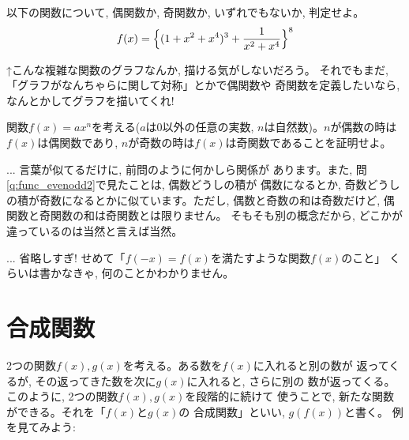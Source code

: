 \begin{q}\label{q:func_evenodd25} 以下の関数について, 偶関数か, 奇関数か, 
いずれでもないか, 判定せよ。
\begin{eqnarray}
f(x)=\Bigl\{(1+x^2+x^4)^3+\frac{1}{x^2+x^4}\Bigr\}^8
\end{eqnarray}\end{q}
↑こんな複雑な関数のグラフなんか, 描ける気がしないだろう。
それでもまだ, 「グラフがなんちゃらに関して対称」とかで偶関数や
奇関数を定義したいなら, なんとかしてグラフを描いてくれ!
\mv

\begin{q}\label{q:func_evenodd28} 関数$f(x)=ax^n$を考える($a$は0以外の任意の実数, $n$は自然数)。$n$が偶数の時は$f(x)$は偶関数であり, $n$が奇数の時は$f(x)$は奇関数であることを証明せよ。\end{q}
\mv

\begin{faq}{\small{} ... 言葉が似てるだけに, 前問のように何かしら関係が
あります。また, 問\ref{q:func_evenodd2}で見たことは, 偶数どうしの積が
偶数になるとか, 奇数どうしの積が奇数になるとかに似ています。ただし, 
偶数と奇数の和は奇数だけど, 偶関数と奇関数の和は奇関数とは限りません。
そもそも別の概念だから, どこかが違っているのは当然と言えば当然。}\end{faq}

\begin{faq}{\small{}
... 省略しすぎ! せめて「$f(-x)=f(x)$を満たすような関数$f(x)$のこと」
くらいは書かなきゃ, 何のことかわかりません。}\end{faq}
\hv


\section{合成関数}\label{sec:gousei_kansu}
2つの関数$f(x), g(x)$を考える。ある数を$f(x)$に入れると別の数が
返ってくるが, その返ってきた数を次に$g(x)$に入れると, さらに別の
数が返ってくる。このように, 2つの関数$f(x), g(x)$を段階的に続けて
使うことで, 新たな関数ができる。それを「$f(x)$と$g(x)$の
合成関数」といい, $g(f(x))$と書く。
例を見てみよう:

